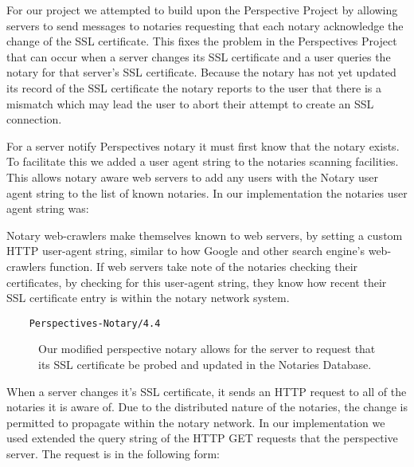 \documentclass[preprint,review,12pt]{elsarticle}
\begin{document}
For our project we attempted to build upon the Perspective Project by allowing
servers to send messages to notaries requesting that each notary acknowledge
the change of the SSL certificate. This fixes the problem in the Perspectives
Project that can occur when a server changes its SSL certificate and a user
queries the notary for that server's SSL certificate. Because the notary has
not yet updated its record of the SSL certificate the notary reports to the user that
there is a mismatch which may lead the user to abort their attempt to create an
SSL connection.

For a server notify Perspectives notary it must first know that the notary
exists. To facilitate this we added a user agent string to the notaries
scanning facilities. This allows notary aware web servers to add any users with
the Notary user agent string to the list of known notaries. In our
implementation the notaries user agent string was:

Notary web-crawlers make themselves known to web servers, by setting a custom
HTTP user-agent string, similar to how Google and other search engine's
web-crawlers function. If web servers take note of the notaries checking their
certificates, by checking for this user-agent string, they know how recent their
SSL certificate entry is within the notary network system.

\begin{verbatim}
    Perspectives-Notary/4.4
\end{verbatim}

\begin{figure}[h]
\caption{Our modified perspective notary allows for the server to request that
    its SSL certificate be probed and updated in the Notaries Database.}
\end{figure}

When a server changes it's SSL certificate, it sends an HTTP request to all of
the notaries it is aware of. Due to the distributed nature of the notaries, the
change is permitted to propagate within the notary network. In our
implementation we used extended the query string of the HTTP GET requests that
the perspective server. The request is in the following form:
\end{document}
